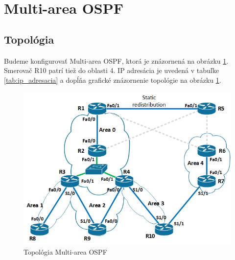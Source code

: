 \documentclass[12pt,twoside,a4paper]{article}
\begin{document}

\section*{Multi-area OSPF}

\subsection*{Topológia}
\paragraph{}
Budeme konfigurovať Multi-area OSPF, ktorá je znázornená na obrázku \ref{fig:multiarea_ospf_topo}. Smerovač R10 patrí tiež do oblasti 4. IP adresácia je uvedená v tabuľke \ref{tab:ip_adresacia} a dopĺňa grafické znázornenie topológie na obrázku \ref{fig:multiarea_ospf_topo}.

\begin{figure}[!htb]
\centering
\includegraphics[width=12cm,keepaspectratio]{multiarea_ospf_topo}
\caption{Topológia Multi-area OSPF}
\label{fig:multiarea_ospf_topo}
\end{figure}
\end{document}
